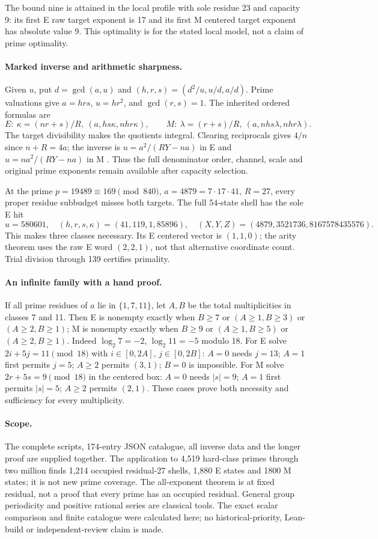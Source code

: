 \documentclass[10pt,a4paper]{article}
\begin{document}
The bound nine is attained in the local profile with sole residue 23 and
capacity 9: its first E raw target exponent is 17 and its first M centered
target exponent has absolute value 9. This optimality is for the stated local
model, not a claim of prime optimality.

\paragraph{Marked inverse and arithmetic sharpness.}
Given $u$, put $d=\gcd(a,u)$ and $(h,r,s)=(d^2/u,u/d,a/d)$.
Prime valuations give $a=hrs$, $u=hr^2$, and $\gcd(r,s)=1$.
The inherited ordered formulas are
\[
 E:\ \kappa=(nr+s)/R,\ (a,hs\kappa,nhr\kappa),\qquad
 M:\ \lambda=(r+s)/R,\ (a,nhs\lambda,nhr\lambda).
 \tag{5}
\]
The target divisibility makes the quotients integral. Clearing reciprocals
gives $4/n$ since $n+R=4a$; the inverse is
$u=a^2/(RY-na)$ in E and $u=na^2/(RY-na)$ in M \cite[\S2]{ET}.
Thus the full denominator order, channel, scale and original prime exponents
remain available after capacity selection.

At the prime $p=19489\equiv169\pmod{840}$, $a=4879=7\cdot17\cdot41$,
$R=27$, every proper residue subbudget misses both targets. The full 54-state
shell has the sole E hit
\[
 u=580601,\quad(h,r,s,\kappa)=(41,119,1,85896),
 \quad(X,Y,Z)=(4879,3521736,8167578435576).
\]
This makes three classes necessary. Its E centered vector is $(1,1,0)$;
the arity theorem uses the raw E word $(2,2,1)$, not that alternative
coordinate count. Trial division through 139 certifies primality.

\paragraph{An infinite family with a hand proof.}
If all prime residues of $a$ lie in $\{1,7,11\}$, let $A,B$ be the total
multiplicities in classes 7 and 11. Then E is nonempty exactly when
$B\ge7$ or $(A\ge1,B\ge3)$ or $(A\ge2,B\ge1)$; M is nonempty exactly when
$B\ge9$ or $(A\ge1,B\ge5)$ or $(A\ge2,B\ge1)$.
Indeed $\log_2 7=-2$, $\log_2 11=-5$ modulo 18. For E solve
$2i+5j=11\pmod{18}$ with $i\in[0,2A]$, $j\in[0,2B]$:
$A=0$ needs $j=13$; $A=1$ first permits $j=5$; $A\ge2$ permits $(3,1)$;
$B=0$ is impossible. For M solve $2r+5s=9\pmod{18}$ in the centered box:
$A=0$ needs $|s|=9$; $A=1$ first permits $|s|=5$; $A\ge2$ permits $(2,1)$.
These cases prove both necessity and sufficiency for every multiplicity.

\paragraph{Scope.}
The complete scripts, 174-entry JSON catalogue, all inverse data and the
longer proof are supplied together. The application to 4,519 hard-class primes
through two million finds 1,214 occupied residual-27 shells, 1,880 E states and
1800 M states; it is not new prime coverage. The all-exponent theorem is at
fixed residual, not a proof that every prime has an occupied residual.
General group periodicity and positive rational series are classical tools.
The exact scalar comparison and finite catalogue were calculated here;
no historical-priority, Lean-build or independent-review claim is made.
\end{document}
